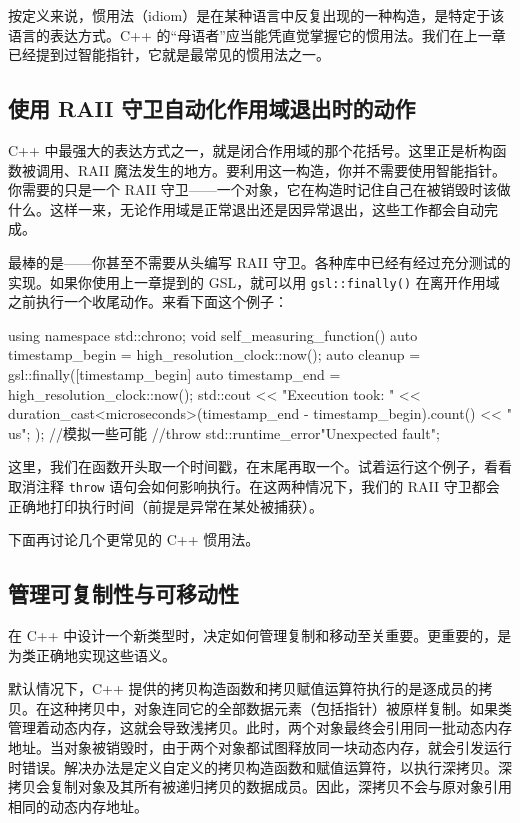 \label{idx:513}
按定义来说，惯用法（idiom）是在某种语言中反复出现的一种构造，是特定于该语言的表达方式。C++ 的“母语者”应当能凭直觉掌握它的惯用法。我们在上一章已经提到过智能指针，它就是最常见的惯用法之一。

\subsection{使用 RAII 守卫自动化作用域退出时的动作}

\label{idx:514}
\label{idx:515}
C++ 中最强大的表达方式之一，就是闭合作用域的那个花括号。这里正是析构函数被调用、RAII 魔法发生的地方。要利用这一构造，你并不需要使用智能指针。你需要的只是一个 RAII 守卫——一个对象，它在构造时记住自己在被销毁时该做什么。这样一来，无论作用域是正常退出还是因异常退出，这些工作都会自动完成。

最棒的是——你甚至不需要从头编写 RAII 守卫。各种库中已经有经过充分测试的实现。如果你使用上一章提到的 GSL，就可以用 \texttt{gsl::\allowbreak{}finally(\allowbreak{})\allowbreak{}} 在离开作用域之前执行一个收尾动作。来看下面这个例子：

\begin{codebox}[cpp]
using namespace std::chrono;
void self_measuring_function() {
    auto timestamp_begin = high_resolution_clock::now();
    auto cleanup = gsl::finally([timestamp_begin] {
        auto timestamp_end = high_resolution_clock::now();
        std::cout << "Execution took: " << duration_cast<microseconds>(timestamp_end - timestamp_begin).count() << " us";
  });
    //模拟一些可能
    //throw std::runtime_error{"Unexpected fault"};
}
\end{codebox}

\label{idx:516}
\label{idx:517}
这里，我们在函数开头取一个时间戳，在末尾再取一个。试着运行这个例子，看看取消注释 \texttt{throw} 语句会如何影响执行。在这两种情况下，我们的 RAII 守卫都会正确地打印执行时间（前提是异常在某处被捕获）。

下面再讨论几个更常见的 C++ 惯用法。

\subsection{管理可复制性与可移动性}

\label{idx:518}
\label{idx:519}
在 C++ 中设计一个新类型时，决定如何管理复制和移动至关重要。更重要的，是为类正确地实现这些语义。

默认情况下，C++ 提供的拷贝构造函数和拷贝赋值运算符执行的是逐成员的拷贝。在这种拷贝中，对象连同它的全部数据元素（包括指针）被原样复制。如果类管理着动态内存，这就会导致浅拷贝。此时，两个对象最终会引用同一批动态内存地址。当对象被销毁时，由于两个对象都试图释放同一块动态内存，就会引发运行时错误。解决办法是定义自定义的拷贝构造函数和赋值运算符，以执行深拷贝。深拷贝会复制对象及其所有被递归拷贝的数据成员。因此，深拷贝不会与原对象引用相同的动态内存地址。

